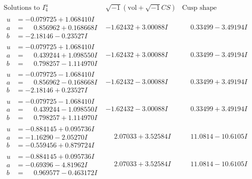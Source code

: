 \documentclass[1p]{elsarticle_modified}
\theoremstyle{definition}
\newcommand{\I}{\sqrt{-1}}
\begin{document}
$$\begin{array}{c|c|c}  
\text{Solutions to }I^u_{4}& \I (\text{vol} + \sqrt{-1}CS) & \text{Cusp shape}\\
 \hline 
\begin{aligned}
u &= -0.079725 + 1.068410 I \\
a &= \phantom{-}0.856962 + 0.168668 I \\
b &= -2.18146 - 0.23527 I\end{aligned}
 & -1.62432 + 3.00088 I & \phantom{-}0.33499 - 3.49194 I \\ \hline\begin{aligned}
u &= -0.079725 + 1.068410 I \\
a &= \phantom{-}0.439244 + 1.098550 I \\
b &= \phantom{-}0.798257 - 1.114970 I\end{aligned}
 & -1.62432 + 3.00088 I & \phantom{-}0.33499 - 3.49194 I \\ \hline\begin{aligned}
u &= -0.079725 - 1.068410 I \\
a &= \phantom{-}0.856962 - 0.168668 I \\
b &= -2.18146 + 0.23527 I\end{aligned}
 & -1.62432 - 3.00088 I & \phantom{-}0.33499 + 3.49194 I \\ \hline\begin{aligned}
u &= -0.079725 - 1.068410 I \\
a &= \phantom{-}0.439244 - 1.098550 I \\
b &= \phantom{-}0.798257 + 1.114970 I\end{aligned}
 & -1.62432 - 3.00088 I & \phantom{-}0.33499 + 3.49194 I \\ \hline\begin{aligned}
u &= -0.884145 + 0.095736 I \\
a &= -1.16290 - 2.05270 I \\
b &= -0.559456 + 0.879724 I\end{aligned}
 & \phantom{-}2.07033 + 3.52584 I & \phantom{-}11.0814 - 10.6105 I \\ \hline\begin{aligned}
u &= -0.884145 + 0.095736 I \\
a &= -0.69396 - 4.81962 I \\
b &= \phantom{-}0.969577 - 0.463172 I\end{aligned}
 & \phantom{-}2.07033 + 3.52584 I & \phantom{-}11.0814 - 10.6105 I \\ \hline\begin{aligned}

\end{aligned}
\end{array}$$
\end{document}
